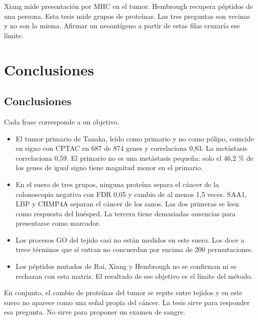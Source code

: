 \documentclass[12pt,oneside]{report}
\begin{document}
Xiang mide presentación por MHC en el tumor. Hembrough recupera péptidos de una persona. Esta tesis mide grupos de proteínas. Las tres preguntas son vecinas y no son la misma. Afirmar un neoantígeno a partir de estas filas cruzaría ese límite.

\chapter{Conclusiones}
\section{Conclusiones}
Cada frase corresponde a un objetivo.

\begin{itemize}
\item El tumor primario de Tanaka, leído como primario y no como pólipo, coincide en signo con CPTAC en 687 de 874 genes y correlaciona 0,83. La metástasis correlaciona 0,59. El primario no es una metástasis pequeña: solo el 46,2 \% de los genes de igual signo tiene magnitud menor en el primario.
\item En el suero de tres grupos, ninguna proteína separa el cáncer de la colonoscopia negativa con FDR 0,05 y cambio de al menos 1,5 veces. SAA1, LBP y CHMP4A separan el cáncer de los sanos. Las dos primeras se leen como respuesta del huésped. La tercera tiene demasiadas ausencias para presentarse como marcador.
\item Los procesos GO del tejido casi no están medidos en este suero. Los doce a trece términos que sí entran no concuerdan por encima de 200 permutaciones.
\item Los péptidos mutados de Rai, Xiang y Hembrough no se confirman ni se rechazan con esta matriz. El resultado de ese objetivo es el límite del método.
\end{itemize}
En conjunto, el cambio de proteínas del tumor se repite entre tejidos y en este suero no aparece como una señal propia del cáncer. La tesis sirve para responder esa pregunta. No sirve para proponer un examen de sangre.
\end{document}
